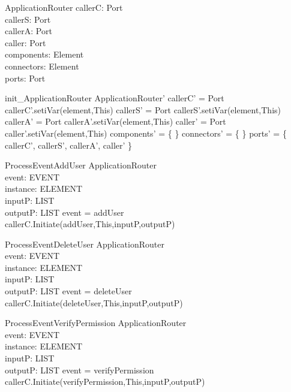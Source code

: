 \begin{schema}{ApplicationRouter}
callerC:  Port \\
callerS:  Port \\
callerA: Port \\
caller:  Port \\
components: \pset Element \\
connectors: \pset Element \\
ports: \pset Port
\end{schema}


\begin{zed}
init\_ApplicationRouter \sdef \lsch ApplicationRouter'
                        \bbar callerC' = \new Port
                        \land callerC'.setiVar(element,This)
                        \land callerS' = \new Port
                        \land callerS'.setiVar(element,This)
                        \land callerA' = \new Port
                        \land callerA'.setiVar(element,This)
                        \land caller' = \new Port
                        \land caller'.setiVar(element,This)
                        \land components' = \{ \}
                        \land connectors' = \{ \}
                        \land ports' = \{ callerC', callerS', callerA', caller' \}  \rsch
                        \end{zed}


\begin{schema}{ProcessEventAddUser}
\Delta ApplicationRouter \\
event: EVENT \\
instance: ELEMENT \\
inputP: LIST \\
outputP: LIST
\where event = addUser \\
callerC.Initiate(addUser,This,inputP,outputP)
\end{schema}

\begin{schema}{ProcessEventDeleteUser}
\Delta ApplicationRouter \\
event: EVENT \\
instance: ELEMENT \\
inputP: LIST \\
outputP: LIST
\where event = deleteUser \\
callerC.Initiate(deleteUser,This,inputP,outputP)
\end{schema}



\begin{schema}{ProcessEventVerifyPermission}
\Delta ApplicationRouter \\
event: EVENT \\
instance: ELEMENT \\
inputP: LIST \\
outputP: LIST
\where event = verifyPermission \\
callerC.Initiate(verifyPermission,This,inputP,outputP)
\end{schema}

